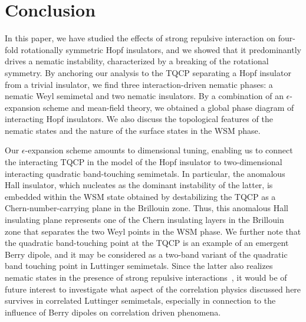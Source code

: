 \documentclass[reprint,floatfix, twocolumn]{revtex4-1}
\begin{document}
\section{Conclusion}\label{sec:conclusion}
In this paper, we have studied the effects of strong repulsive interaction on  four-fold rotationally symmetric Hopf insulators, and we showed that it predominantly drives a nematic instability,  characterized by a breaking of the rotational symmetry.
By anchoring our analysis to the TQCP  separating a Hopf insulator from a trivial insulator, we find three interaction-driven nematic phases: a nematic Weyl semimetal and two nematic insulators.
By a combination of an $\epsilon$-expansion scheme and mean-field theory, we obtained a global phase diagram of interacting Hopf insulators. 
We also discuss the topological features of the nematic states and the nature of the surface states in the WSM phase.

Our $\epsilon$-expansion scheme amounts to dimensional tuning, enabling us to connect the interacting TQCP in the model of the Hopf insulator to two-dimensional interacting quadratic band-touching semimetals. 
In particular, the anomalous Hall insulator, which nucleates as the dominant instability of the latter, is embedded within the WSM state obtained by destabilizing the TQCP as a Chern-number-carrying plane in the Brillouin zone. 
Thus, this anomalous Hall insulating plane represents one of the Chern insulating layers in the  Brillouin zone that separates the two Weyl points in the WSM phase.
We further note that the quadratic band-touching point at the TQCP is an example of an emergent Berry dipole, and it may be considered as a two-band variant of the quadratic band touching point in Luttinger semimetals. 
Since the latter also realizes nematic states in the presence of strong repulsive interactions~\cite{Goswami2017}, it would be of future interest to investigate what aspect of the correlation physics discussed here survives in correlated Luttinger semimetals, especially in connection to the influence of Berry dipoles on  correlation driven phenomena.
\end{document}
